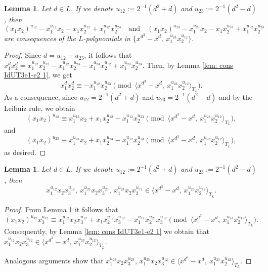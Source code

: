 \documentclass[a4paper,reqno]{amsart}
\newtheorem{lemma}[theorem]{Lemma}
\theoremstyle{definition}
\numberwithin{equation}{section}
\numberwithin{theorem}{section}
\begin{document}
\begin{lemma}\label{lem: cons IdUT3e1-e2 2}
    Let $d\in L$. If we denote $u_{12}:=2^{-1}(d^2+d)$ and $u_{23}:=2^{-1}(d^2-d)$, then 
$$
(x_1 x_2)^{u_{12}}- x_1^{u_{12}} x_2 - x_1x_2^{u_{12}}+ x_1^{u_{12}} x_2^{u_{23}} \quad \text{and} \quad  
(x_1 x_2)^{u_{23}}- x_1^{u_{23}} x_2 - x_1x_2^{u_{23}}+ x_1^{u_{12}} x_2^{u_{23}}
$$
are consequences of the $L$-polynomials in $\{ x^{d^3}-x^{d}, \ x_1^{u_{23}}x_2^{u_{12}}\} $.
\end{lemma}
\begin{proof}
    Since $d=u_{12}-u_{23}$, it follows that 
    $x_1^d x_2^d =x_1^{u_{12}}x_2^{u_{12}}- x_1^{u_{12}}x_2^{u_{23}} - x_1^{u_{23}}x_2^{u_{12}} + x_1^{u_{23}} x_2^{u_{23}}.$
    Then, by Lemma \ref{lem: cons IdUT3e1-e2 1}, we get 
   $$
   x_1^{d}x_2^{d}\equiv - x_1^{u_{12}} x_2^{u_{23}}\pmod{\langle x^{d^3}-x^{d}, \ x_1^{u_{23}}x_2^{u_{12}} \rangle_{T_L}}.
   $$
As a consequence, since $u_{12}=2^{-1}(d^2+d)$ and $u_{23}=2^{-1}(d^2-d)$ and by the Leibniz rule, we obtain
$$
(x_1 x_2)^{u_{12}}\equiv x_1^{u_{12}} x_2 + x_1x_2^{u_{12}}- x_1^{u_{12}} x_2^{u_{23}} \pmod{\langle x^{d^3}-x^{d}, \ x_1^{u_{23}}x_2^{u_{12}} \rangle_{T_L}},
$$
and
$$
(x_1 x_2)^{u_{23}}\equiv x_1^{u_{23}} x_2 + x_1x_2^{u_{23}}- x_1^{u_{12}} x_2^{u_{23}} \pmod{\langle x^{d^3}-x^{d}, \ x_1^{u_{23}}x_2^{u_{12}} \rangle_{T_L}},
$$
as desired.
\end{proof}

\begin{lemma}\label{lem: cons IdUT3e1-e2 3}
    Let $d\in L$. If we denote $u_{12}:=2^{-1}(d^2+d)$ and $u_{23}:=2^{-1}(d^2-d)$, then
    $$ x_1^{u_{12}}x_2 x_3^{u_{12}}, \ x_1^{u_{23}} x_2 x_3^{u_{23}}, \ x_1^{u_{23}}x_2x_3^{u_{12}} \in \langle x^{d^3}-x^{d}, \ x_1^{u_{23}}x_2^{u_{12}}\rangle_{T_L}.$$
\end{lemma}
\begin{proof}
From Lemma \ref{lem: cons IdUT3e1-e2 2} it follows that 
$$
(x_1 x_2)^{u_{12}}x_3^{u_{12}}\equiv x_1^{u_{12}} x_2 x_3^{u_{12}} + x_1x_2^{u_{12}} x_3^{u_{12}}- x_1^{u_{12}} x_2^{u_{23}}x_3^{u_{12}} \pmod{\langle x^{d^3}-x^{d}, \ x_1^{u_{23}}x_2^{u_{12}} \rangle_{T_L}}.
$$
Consequently, by Lemma \ref{lem: cons IdUT3e1-e2 1} we obtain that  $x_1^{u_{12}}x_2 x_3^{u_{12}}\in \langle x^{d^3}-x^{d}, \ x_1^{u_{23}}x_2^{u_{12}}\rangle_{T_L}$. 

Analogous arguments show that $ x_1^{u_{23}} x_2 x_3^{u_{23}}, \, x_1^{u_{23}}x_2x_3^{u_{12}} \in \langle x^{d^3}-x^{d}, \ x_1^{u_{23}}x_2^{u_{12}}\rangle_{T_L}.$
\end{proof}
\end{document}
